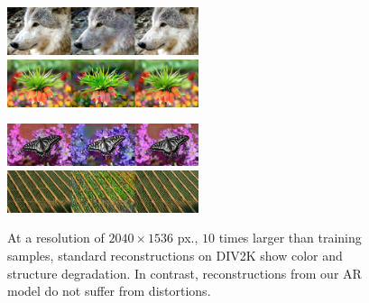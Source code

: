 \begin{figure}[t]
\begin{minipage}[t]{0.166\textwidth}
\centering\textbf{\colorbox{white}{}}
\end{minipage}\begin{minipage}[t]{0.166\textwidth}
\centering \textbf{\colorbox{white}{}}
\end{minipage}\begin{minipage}[t]{0.1725\textwidth}
\centering \textbf{\colorbox{white}{}}
\end{minipage}\begin{minipage}[t]{0.166\textwidth}
\centering\textbf{\colorbox{white}{}}
\end{minipage}\begin{minipage}[t]{0.166\textwidth}
\centering \textbf{\colorbox{white}{}}
\end{minipage}\begin{minipage}[t]{0.166\textwidth}
\centering \textbf{\colorbox{white}{}}
\end{minipage}

\vspace{-0.1 cm}    
\includegraphics[width=0.5\textwidth]{figs/hires/tile_hires01_7.jpg}
\includegraphics[width=0.5\textwidth]{figs/hires/tile_hires01_5.jpg}

\includegraphics[width=0.5\textwidth]{figs/hires/tile_hires01_10.jpg}
\includegraphics[width=0.5\textwidth]{figs/hires/tile_hires01_11.jpg}

\vspace{-0.1 cm}
\caption{\label{fig:hires}At a resolution of $2040\times 1536$ px., $10$ times larger than training samples, standard reconstructions on DIV2K show color and structure degradation. In contrast, reconstructions from our AR model do not suffer from distortions.}
\vspace{-0.5 cm}
\end{figure}

